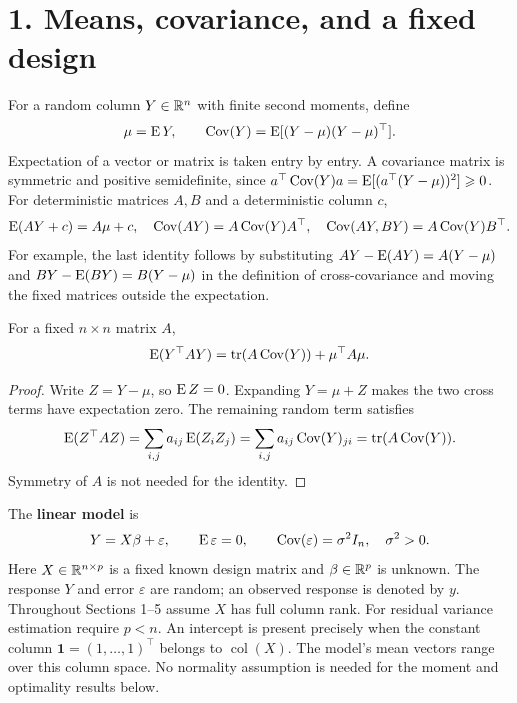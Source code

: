 \section*{1. Means, covariance, and a fixed design}
For a random column $Y\in\mathbb R^n$ with finite second moments, define
\[
\mu=\operatorname{E} Y,\qquad \operatorname{Cov}(Y)=\operatorname{E}[(Y-\mu)(Y-\mu)^\top].
\]
Expectation of a vector or matrix is taken entry by entry. A covariance
matrix is symmetric and positive semidefinite, since
$a^\top\operatorname{Cov}(Y)a=\operatorname{E}[(a^\top(Y-\mu))^2]\geqslant0$.
For deterministic matrices $A,B$ and a deterministic column $c$,
\[
\operatorname{E}(AY+c)=A\mu+c,\quad \operatorname{Cov}(AY)=A\operatorname{Cov}(Y)A^\top,\quad
\operatorname{Cov}(AY,BY)=A\operatorname{Cov}(Y)B^\top.
\]
For example, the last identity follows by substituting
$AY-\operatorname{E}(AY)=A(Y-\mu)$ and $BY-\operatorname{E}(BY)=B(Y-\mu)$ in the definition of
cross-covariance and moving the fixed matrices outside the expectation.

\begin{proposition}\label{prop:11:quadratic}
For a fixed $n\times n$ matrix $A$,
\[
\operatorname{E}(Y^\top AY)=\operatorname{tr}(A\operatorname{Cov}(Y))+\mu^\top A\mu.
\]
\end{proposition}
\begin{proof}
Write $Z=Y-\mu$, so $\operatorname{E} Z=0$. Expanding $Y=\mu+Z$ makes the two
cross terms have expectation zero. The remaining random term satisfies
\[
\operatorname{E}(Z^\top AZ)=\sum_{i,j}a_{ij}\operatorname{E}(Z_iZ_j)
=\sum_{i,j}a_{ij}\operatorname{Cov}(Y)_{ji}=\operatorname{tr}(A\operatorname{Cov}(Y)).
\]
Symmetry of $A$ is not needed for the identity.
\end{proof}

The \textbf{linear model} is
\[
Y=X\beta+\varepsilon,\qquad
\operatorname{E}\varepsilon=0,\qquad \operatorname{Cov}(\varepsilon)=\sigma^2I_n,
\quad\sigma^2>0.
\]
Here $X\in\mathbb R^{n\times p}$ is a fixed known design matrix and
$\beta\in\mathbb R^p$ is unknown. The response $Y$ and error $\varepsilon$ are
random; an observed response is denoted by $y$. Throughout Sections 1--5
assume $X$ has full column rank. For residual variance estimation require
$p<n$. An intercept is present precisely when the constant column
$\mathbf1=(1,\ldots,1)^\top$ belongs to $\operatorname{col}(X)$.
The model's mean vectors range over this column space. No normality
assumption is needed for the moment and optimality results below.

